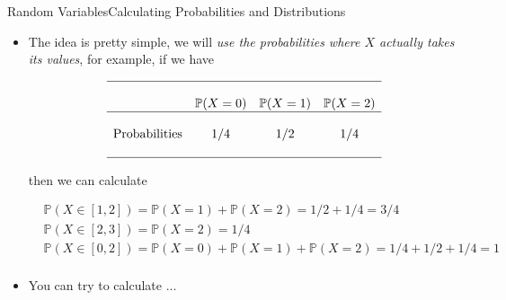 \documentclass[8pt, usepdftitle = false]{beamer}
\begin{document}
\begin{frame}[allowframebreaks]{Random Variables}{Calculating Probabilities and Distributions}
\begin{itemize}
\item The idea is pretty simple, we will \emph{use the probabilities where $X$ actually takes its values}, for example, if we have 



\begin{align*}
\begin{array}{cccc}
\hline \\
& \mathbb{P}(X=0)  & \mathbb{P}(X=1) & \mathbb{P}(X=2) \\
\hline \\
 \text{Probabilities} & 1/4 & 1/2 & 1/4 \\
\\
\hline
\end{array}
\end{align*}


then we can calculate 

\begin{align*}
& \mathbb{P}(X \in[1,2])  = \mathbb{P}(X=1) + \mathbb{P}(X=2) = 1/2 + 1/4 = 3/4 \\
& \mathbb{P}(X \in[2,3]) = \mathbb{P}(X=2)  = 1/4 \\
& \mathbb{P}(X \in[0,2]) = \mathbb{P}(X=0) + \mathbb{P}(X=1) + \mathbb{P}(X=2) = 1/4 + 1/2 + 1/4 = 1 \\
\end{align*}






 

\framebreak

\item You can try to calculate ... 



\end{itemize}
\end{frame}
\end{document}
